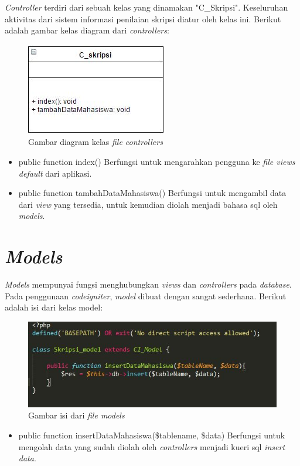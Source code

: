 	\textit{Controller} terdiri dari sebuah kelas yang dinamakan "C\_Skripsi". Keseluruhan aktivitas dari sistem informasi penilaian skripsi diatur oleh kelas ini. Berikut adalah gambar kelas diagram dari \textit{controllers}:
	\begin{figure}[H]
		\centering
		\includegraphics[scale= 1.0]{Gambar/C_skripsi}
		\caption {Gambar diagram kelas \textit{file controllers}}
		\label{fig:controllers}
	\end{figure}
	
	\begin{itemize}
		\item public function index()
		Berfungsi untuk mengarahkan pengguna ke \textit{file views default} dari aplikasi.
		\item public function tambahDataMahasiswa()
		Berfungsi untuk mengambil data dari \textit{view} yang tersedia, untuk kemudian diolah menjadi bahasa sql oleh \textit{models}.
	\end{itemize}
	
	\section{\textit{Models}}
	\label{sec: models}
	
	\textit{Models} mempunyai fungsi menghubungkan \textit{views} dan \textit{controllers} pada \textit{database}. Pada penggunaan \textit{codeigniter}, \textit{model} dibuat dengan sangat sederhana. Berikut adalah isi dari kelas model:
	\begin{figure}[H]
		\centering
		\includegraphics[scale= 1.0]{Gambar/models}
		\caption {Gambar isi dari \textit{file models}}
		\label{fig:models}
	\end{figure}
	\begin{itemize}
		\item public function insertDataMahasiswa(\$tablename, \$data)
		Berfungsi untuk mengolah data yang sudah diolah oleh \textit{controllers} menjadi kueri sql \textit{insert data}.
	\end{itemize}
	